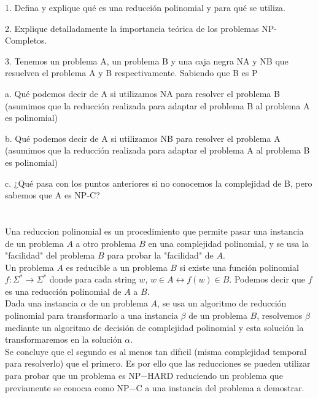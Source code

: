 1. Defina y explique qué es una reducción polinomial y para qué se utiliza.

2. Explique detalladamente la importancia teórica de los problemas NP-Completos.

3. Tenemos un problema A, un problema B y una caja negra NA y NB que resuelven el problema A y B respectivamente. Sabiendo que B es P

    a. Qué podemos decir de A si utilizamos NA para resolver el problema B (asumimos que la reducción realizada para adaptar el problema B al problema A es polinomial)

    b. Qué podemos decir de A si utilizamos NB para resolver el problema A (asumimos que la reducción realizada para adaptar el problema A al problema B es polinomial)

    c. ¿Qué pasa con los puntos anteriores si no conocemos la complejidad de B, pero sabemos que A es NP-C? \\

\section{}

Una reduccion polinomial es un procedimiento que permite pasar una instancia de un problema $A$ a otro problema $B$ en una complejidad polinomial, y se usa la "facilidad" del problema $B$ para probar la "facilidad" de $A$. \\


Un problema $A$ es reducible a un problema $B$ si existe una función polinomial $f: \Sigma^* \rightarrow \Sigma^*$ donde para cada string $w$, $w \in A \leftrightarrow f(w) \in B$. Podemos decir que $f$ es una reducción polinomial de $A$ a $B$.\\

Dada una instancia $\alpha$ de un problema $A$, se usa un algoritmo de reducción polinomial para transformarlo a una instancia $\beta$ de un problema $B$,  resolvemos  $\beta$ mediante  un  algoritmo de decisión de complejidad polinomial y esta solución la transformaremos en la solución $\alpha$. \\

Se concluye que el segundo es al menos tan difıcil (misma complejidad temporal para resolverlo) que el primero. Es por ello que las reducciones se  pueden utilizar  para  probar  que  un  problema  es NP$−$HARD reduciendo  un problema  que previamente se conocıa como NP$−$C a una instancia del problema a demostrar.\\

